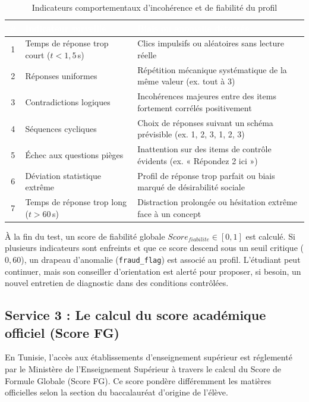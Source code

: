 \begin{table}[H]
\centering
\small
\begin{tabular}{|c|p{5cm}|p{7.5cm}|}
\hline
\rowcolor{headercolor} 
\textcolor{white}{\textbf{\#}} & \textcolor{white}{\textbf{Indicateur surveillé}} & \textcolor{white}{\textbf{Biais ou anomalie détectée}} \\
\hline
1 & Temps de réponse trop court ($t < 1{,}5$\,s) & Clics impulsifs ou aléatoires sans lecture réelle \\
\hline
\rowcolor{rowgray}
2 & Réponses uniformes & Répétition mécanique systématique de la même valeur (ex. tout à 3) \\
\hline
3 & Contradictions logiques & Incohérences majeures entre des items fortement corrélés positivement \\
\hline
\rowcolor{rowgray}
4 & Séquences cycliques & Choix de réponses suivant un schéma prévisible (ex. 1, 2, 3, 1, 2, 3) \\
\hline
5 & Échec aux questions pièges & Inattention sur des items de contrôle évidents (ex. « Répondez 2 ici ») \\
\hline
\rowcolor{rowgray}
6 & Déviation statistique extrême & Profil de réponse trop parfait ou biais marqué de désirabilité sociale \\
\hline
7 & Temps de réponse trop long ($t > 60$\,s) & Distraction prolongée ou hésitation extrême face à un concept \\
\hline
\end{tabular}
\caption{Indicateurs comportementaux d'incohérence et de fiabilité du profil}
\label{tab:alertes}
\end{table}

À la fin du test, un score de fiabilité globale $Score_{fiabilite} \in [0, 1]$ est calculé. Si plusieurs indicateurs sont enfreints et que ce score descend sous un seuil critique ($0{,}60$), un drapeau d'anomalie (\texttt{fraud\_flag}) est associé au profil. L'étudiant peut continuer, mais son conseiller d'orientation est alerté pour proposer, si besoin, un nouvel entretien de diagnostic dans des conditions contrôlées.

\subsection{Service 3 : Le calcul du score académique officiel (Score FG)}

En Tunisie, l'accès aux établissements d'enseignement supérieur est réglementé par le Ministère de l'Enseignement Supérieur à travers le calcul du Score de Formule Globale (Score FG). Ce score pondère différemment les matières officielles selon la section du baccalauréat d'origine de l'élève.

